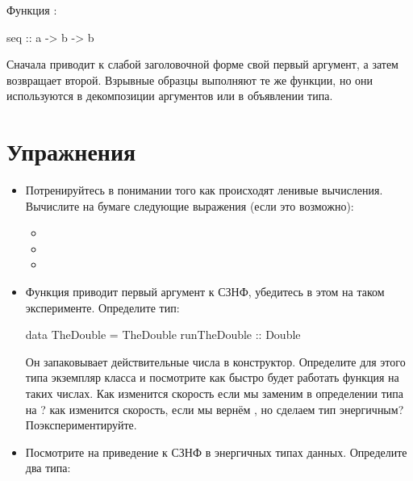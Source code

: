 Функция :

\begin{code}
seq :: a -> b -> b
\end{code}

Сначала приводит к слабой заголовочной форме свой первый
аргумент, а затем возвращает второй. Взрывные образцы
выполняют те же функции, но они используются в декомпозиции 
аргументов или в объявлении типа. 

\section{Упражнения}

\begin{itemize}

\item Потренируйтесь в понимании того как происходят
        ленивые вычисления. Вычислите на бумаге 
        следующие выражения (если это возможно):

\begin{itemize}
\item 
{}

\item {}
\item {}
\end{itemize}

\item Функция  приводит первый аргумент к СЗНФ,
    убедитесь в этом на таком эксперименте. Определите
    тип:

\begin{code}
data TheDouble = TheDouble { runTheDouble :: Double }
\end{code} 

Он запаковывает действительные числа в конструктор. 
Определите для этого типа экземпляр класса  
и посмотрите как быстро будет работать функция 
на таких числах. Как изменится скорость если мы заменим
в определении типа  на ? 
как изменится скорость, если мы вернём , но
сделаем тип  энергичным? Поэкспериментируйте.

\item Посмотрите на приведение к СЗНФ в энергичных типах данных.
Определите два типа:


\end{itemize}

